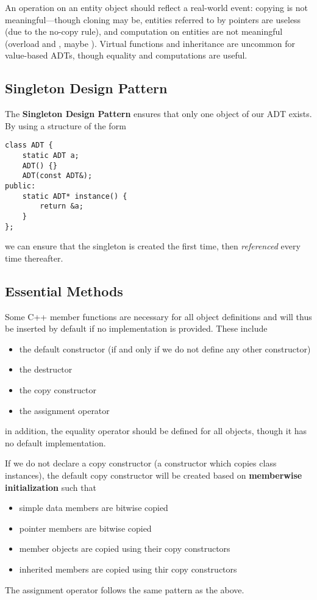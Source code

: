 \documentclass[12pt]{article}
\begin{document}
An operation on an entity object should reflect a real-world event: copying is not meaningful---though cloning may be, entities referred to by pointers are useless (due to the no-copy rule), and computation on entities are not meaningful (overload  and , maybe ). Virtual functions and inheritance are uncommon for value-based ADTs, though equality and computations are useful.

\subsection{Singleton Design Pattern}
The {\bf Singleton Design Pattern} ensures that only one object of our ADT exists. By using a structure of the form
\begin{lstlisting}
class ADT {
    static ADT a;
    ADT() {}
    ADT(const ADT&);
public:
    static ADT* instance() {
        return &a;
    }
};
\end{lstlisting}
we can ensure that the singleton is created the first time, then \emph{referenced} every time thereafter.

\subsection{Essential Methods}
Some C++ member functions are necessary for all object definitions and will thus be inserted by default if no implementation is provided. These include
\begin{itemize}
\item the default constructor (if and only if we do not define any other constructor)
\item the destructor
\item the copy constructor
\item the assignment operator
\end{itemize}
in addition, the equality operator should be defined for all objects, though it has no default implementation.

If we do not declare a copy constructor (a constructor which copies class instances), the default copy constructor will be created based on {\bf memberwise initialization} such that
\begin{itemize}
\item simple data members are bitwise copied
\item pointer members are bitwise copied
\item member objects are copied using their copy constructors
\item inherited members are copied using thir copy constructors
\end{itemize}
The assignment operator follows the same pattern as the above.
\end{document}
